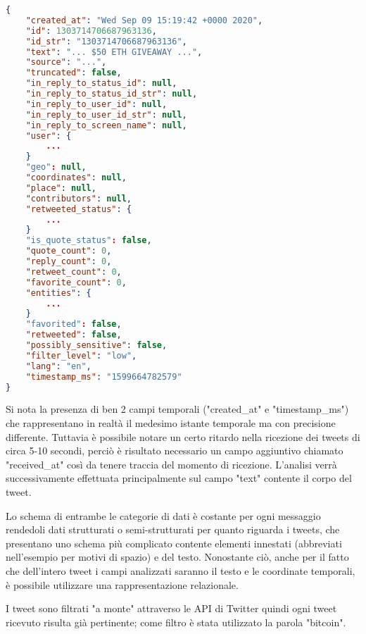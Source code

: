 \begin{lstlisting}[language=json,firstnumber=1]
{
    "created_at": "Wed Sep 09 15:19:42 +0000 2020",
    "id": 1303714706687963136,
    "id_str": "1303714706687963136",
    "text": "... $50 ETH GIVEAWAY ...",
    "source": "...",
    "truncated": false,
    "in_reply_to_status_id": null,
    "in_reply_to_status_id_str": null,
    "in_reply_to_user_id": null,
    "in_reply_to_user_id_str": null,
    "in_reply_to_screen_name": null,
    "user": {
        ...
    }
    "geo": null,
    "coordinates": null,
    "place": null,
    "contributors": null,
    "retweeted_status": {
        ...
    }
    "is_quote_status": false,
    "quote_count": 0,
    "reply_count": 0,
    "retweet_count": 0,
    "favorite_count": 0,
    "entities": {
        ...
    }
    "favorited": false,
    "retweeted": false,
    "possibly_sensitive": false,
    "filter_level": "low",
    "lang": "en",
    "timestamp_ms": "1599664782579"
}
\end{lstlisting}
%
Si nota la presenza di ben 2 campi temporali ("created\_at" e "timestamp\_ms") che
rappresentano in realtà il medesimo istante temporale ma con precisione differente.
Tuttavia è possibile notare un certo ritardo nella ricezione dei tweets di circa 5-10
secondi, perciò è risultato necessario un campo aggiuntivo chiamato "received\_at" così
da tenere traccia del momento di ricezione.
L'analisi verrà successivamente effettuata principalmente sul campo "text" contente il
corpo del tweet.

Lo schema di entrambe le categorie di dati è costante per ogni messaggio rendedoli dati
strutturati o semi-strutturati per quanto riguarda i tweets, che presentano uno schema più complicato
contente elementi innestati (abbreviati nell'esempio per motivi di spazio) e del testo.
Nonostante ciò, anche per il fatto che dell'intero tweet i campi analizzati saranno il testo
e le coordinate temporali, è possibile utilizzare una rappresentazione relazionale.

I tweet sono filtrati "a monte" attraverso le API di Twitter quindi ogni tweet ricevuto risulta già
pertinente; come filtro è stata utilizzato la parola "bitcoin".


